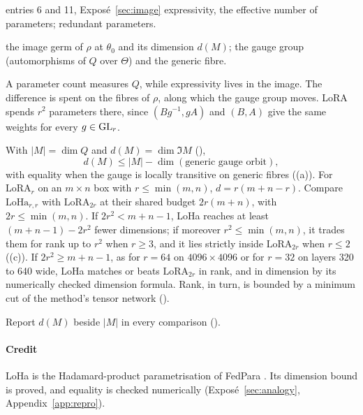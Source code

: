 \begin{example*}{entries 6 and 11, Exposé~\ref{sec:image}}
\enspace expressivity, the effective number of parameters; redundant parameters.\par
\noindent{}\enspace the image germ of $\rho$ at $\theta_0$ and its
dimension $d(M)$; the gauge group (automorphisms of $Q$ over $\Theta$) and the generic fibre.
\end{example*}

A parameter count measures $Q$, while expressivity lives in the image. The difference is spent on the fibres of $\rho$,
along which the gauge group moves. LoRA spends $r^2$ parameters there, since $(Bg^{-1},gA)$ and $(B,A)$ give the same
weights for every $g\in\mathrm{GL}_r$.

With $\lvert M\rvert=\dim Q$ and $d(M)=\dim\Im M$ (),
\begin{equation}\label{eq:rosetta-gauge}
  d(M)\le\lvert M\rvert-\dim(\text{generic gauge orbit}),
\end{equation}
with equality when the gauge is locally transitive on generic fibres ((a)). For
$\mathrm{LoRA}_r$ on an $m\times n$ box with $r\le\min(m,n)$, $d=r(m+n-r)$. Compare $\mathrm{LoHa}_{r,r}$ with
$\mathrm{LoRA}_{2r}$ at their shared budget $2r(m+n)$, with $2r\le\min(m,n)$. If $2r^2<m+n-1$, LoHa reaches at least
$(m+n-1)-2r^2$ fewer dimensions; if moreover $r^2\le\min(m,n)$, it trades them for rank up to $r^2$ when $r\ge3$, and
it lies strictly inside $\mathrm{LoRA}_{2r}$ when $r\le2$ ((c)). If $2r^2\ge m+n-1$, as for
$r=64$ on $4096\times4096$ or for $r=32$ on layers 320 to 640 wide, LoHa matches or beats $\mathrm{LoRA}_{2r}$ in
rank, and in dimension by its numerically checked dimension formula. Rank, in turn, is bounded by a minimum cut of the
method's tensor network ().

\begin{explains}
Report $d(M)$ beside $\lvert M\rvert$ in every comparison ().
\end{explains}

\paragraph{Credit}
LoHa is the Hadamard-product parametrisation of FedPara \citep{hyeonwoo2021fedpara}. Its dimension bound is proved, and
equality is checked numerically (Exposé~\ref{sec:analogy}, Appendix~\ref{app:repro}).

